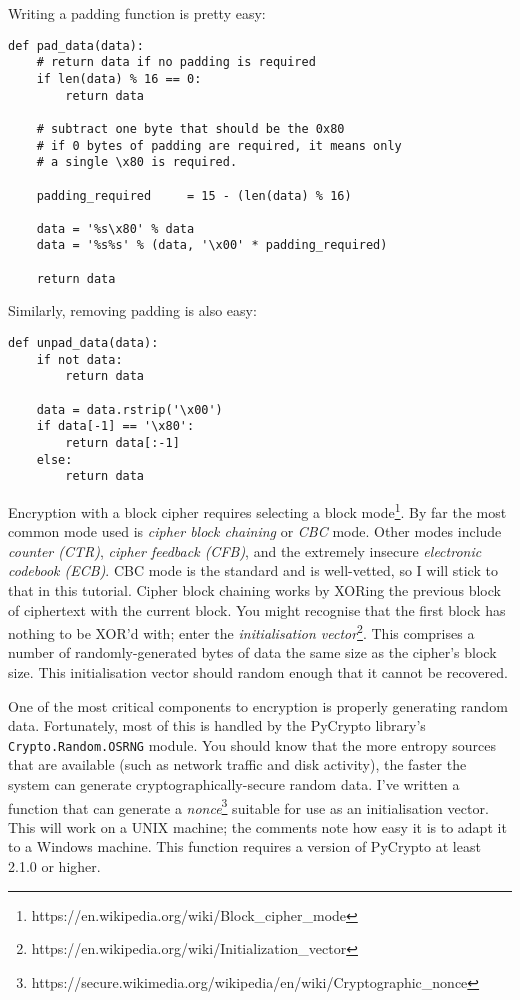 \documentclass[letterpaper,10pt]{article}
\begin{document}
Writing a padding function is pretty easy:

\begin{verbatim}
def pad_data(data):
    # return data if no padding is required
    if len(data) % 16 == 0: 
        return data

    # subtract one byte that should be the 0x80
    # if 0 bytes of padding are required, it means only
    # a single \x80 is required.

    padding_required     = 15 - (len(data) % 16)

    data = '%s\x80' % data
    data = '%s%s' % (data, '\x00' * padding_required)

    return data
\end{verbatim}

Similarly, removing padding is also easy:

\begin{verbatim}
def unpad_data(data):
    if not data: 
        return data

    data = data.rstrip('\x00')
    if data[-1] == '\x80':
        return data[:-1]
    else:
        return data
\end{verbatim}

Encryption with a block cipher requires selecting a block
mode\footnote{https://en.wikipedia.org/wiki/Block\_cipher\_mode}.  By far the
most common mode used is \emph{cipher block chaining} or \emph{CBC} mode.
Other modes include \emph{counter (CTR)}, \emph{cipher feedback (CFB)}, and
the extremely insecure \emph{electronic codebook (ECB)}. CBC mode is the
standard and is well-vetted, so I will stick to that in this tutorial.
Cipher block chaining works by XORing the previous block of ciphertext
with the current block. You might recognise that the first block
has nothing to be XOR'd with; enter the \emph{initialisation
vector}\footnote{https://en.wikipedia.org/wiki/Initialization\_vector}.  This
comprises a number of randomly-generated bytes of data the same
size as the cipher's block size. This initialisation vector should
random enough that it cannot be recovered.

One of the most critical components to encryption is properly
generating random data. Fortunately, most of this is handled by the
PyCrypto library’s \verb|Crypto.Random.OSRNG| module. You should know
that the more entropy sources that are available (such as network
traffic and disk activity), the faster the system can generate
cryptographically-secure random data. I've written a function that
can generate a
\emph{nonce}\footnote{https://secure.wikimedia.org/wikipedia/en/wiki/Cryptographic\_nonce}
suitable for use as an initialisation vector. This will work on a
UNIX machine; the comments note how easy it is to adapt it to a
Windows machine. This function requires a version of PyCrypto at
least 2.1.0 or higher.
\end{document}

